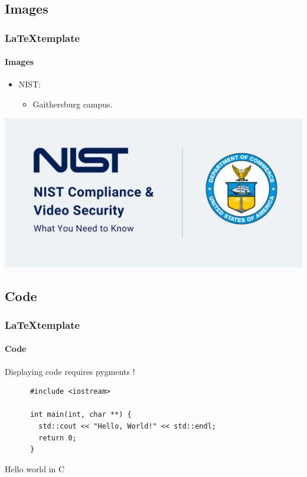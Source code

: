 \subsection{Images}
\begin{frame}
  \frametitle{\LaTeX template}
  \framesubtitle{Images}

  \begin{minipage}[h!]{0.45\textwidth}
    \begin{itemize}
      \item NIST:
      \begin{itemize}
        \item Gaithersburg campus.
      \end{itemize}
    \end{itemize}
  \end{minipage}\hfill
  \begin{minipage}[h!]{0.45\textwidth}
    \includegraphics[scale=0.2]{./img/example-image.png}
  \end{minipage}
\end{frame}

\subsection{Code}
\begin{frame}[containsverbatim]
  \frametitle{\LaTeX template}
  \framesubtitle{Code}

  Displaying code requires pygments !

  \begin{listing}[H]
    \begin{verbatim}
      #include <iostream>

      int main(int, char **) {
        std::cout << "Hello, World!" << std::endl;
        return 0;
      }
    \end{verbatim}
    \caption{Hello world in C}
  \end{listing}

\end{frame}

